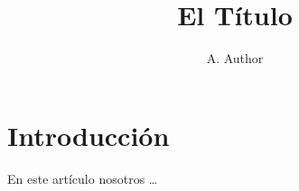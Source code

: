 \documentclass{article}
\title{El T\'itulo}
\author{A. Author}
\begin{document}
\maketitle

\section{Introducci\'on}

En este art\'iculo nosotros \ldots
\end{document}
